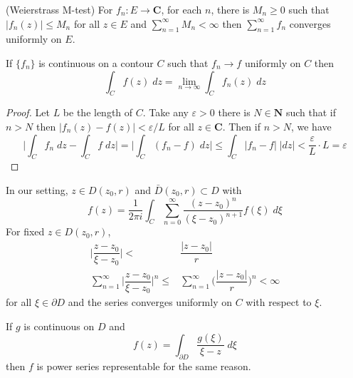 \vspace{2ex}
\begin{thm}
(Weierstrass M-test) For $f_{n}:E\rightarrow {\bm C}$, for each $n$, there is $M_{n}\geq 0$ such that $|f_{n}(z)|\leq M_{n}$ for all $z\in E$ and $\sum ^{\infty }_{n=1}M_{n}<\infty $ then $\sum ^{\infty }_{n=1}f_{n}$ converges uniformly on $E$.
\end{thm}
\vspace{2ex}
\begin{thm}
If $\{f_{n}\}$ is continuous on a contour $C$ such that $f_{n}\rightarrow f$ uniformly on $C$ then
\[\int _{C}f(z)\;dz=\lim _{n\rightarrow \infty }\int _{C}f_{n}(z)\;dz\]
\end{thm}
\vspace{2ex}
\begin{proof}
Let $L$ be the length of $C$. Take any $\varepsilon >0$ there is $N\in {\bm N}$ such that if $n>N$ then $|f_{n}(z)-f(z)|<\varepsilon /L$ for all $z\in {\bm C}$. Then if $n>N$, we have
\[\Big|\int _{C}f_{n}\;dz-\int _{C}f\;dz\Big|=\Big|\int _{C}(f_{n}-f)\;dz\Big|\leq\int _{C}|f_{n}-f|\;|dz|<\dfrac{\varepsilon }{L}\cdot L=\varepsilon \]
\end{proof}
\vspace{2ex}
\begin{rmk}
In our setting, $z\in D(z_0,r)$ and $\bar{D}(z_0,r)\subset D$ with
\[f(z)=\dfrac{1}{2\pi i}\int _{C}\sum ^{\infty }_{n=0}\dfrac{(z-z_0)^{n}}{(\xi -z_0)^{n+1}}f(\xi )\;d\xi \]
For fixed $z\in D(z_0,r)$,
\begin{align*}
\Big|\dfrac{z-z_0}{\xi -z_0}\Big|<&\dfrac{|z-z_0|}{r}\\
\sum ^{\infty }_{n=1}\Big|\dfrac{z-z_0}{\xi -z_0}\Big|^{n}\leq &\sum ^{\infty }_{n=1}\Big(\dfrac{|z-z_0|}{r}\Big)^{n}<\infty 
\end{align*}
for all $\xi \in \partial D$ and the series converges uniformly on $C$ with respect to $\xi $.
\end{rmk}
\vspace{2ex}
\begin{ex}
If $g$ is continuous on $D$ and
\[f(z)=\int _{\partial D}\dfrac{g(\xi )}{\xi -z}\;d\xi \]
then $f$ is power series representable for the same reason.
\end{ex}
\vspace{2ex}

